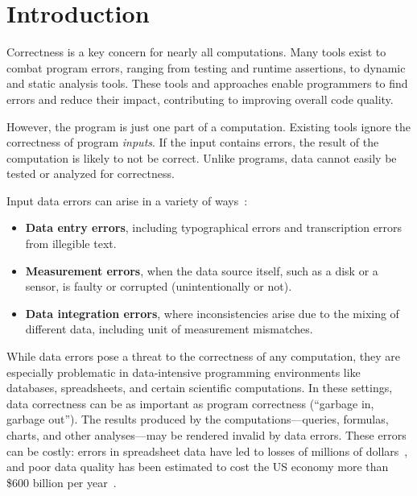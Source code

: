 \section{Introduction}
\label{sec:introduction}

Correctness is a key
concern for nearly all computations. Many tools exist to combat program errors, ranging from testing and
runtime assertions, to dynamic and static analysis tools. 
These tools and approaches enable programmers to find errors and
reduce their impact, contributing to improving overall code quality.


However, the program is just one part of a computation. Existing tools ignore the correctness of program \emph{inputs}. If the input contains errors, the
result of the computation is likely to not be correct. Unlike
programs, data cannot easily be tested or analyzed for correctness.

Input data
errors can arise in a variety of ways~\cite{hellerstein2008quantitative}:

\begin{itemize}

\item {\bf Data entry errors}, including typographical errors and transcription errors from illegible text.

\item {\bf Measurement errors}, when the data source itself, such as a disk or a sensor, is faulty or corrupted (unintentionally or not).

\item {\bf Data integration errors}, where inconsistencies arise due to the mixing of different data, including unit of measurement mismatches.

\end{itemize}


While data errors pose a threat to the correctness of any computation,
they are especially problematic in data-intensive programming
environments like databases, spreadsheets, and certain scientific
computations. In these settings, data correctness can be as important
as program correctness (``garbage in, garbage out''). The results
produced by the computations---queries, formulas, charts, and other
analyses---may be rendered invalid by data errors. These errors can be
costly: errors in spreadsheet data have led to losses of millions of
dollars~\cite{DBLP:journals/corr/abs-0803-2527,sakalerrors}, and poor
data quality has been estimated to cost the US economy more than \$600
billion per year~\cite{eckerson2002}.

